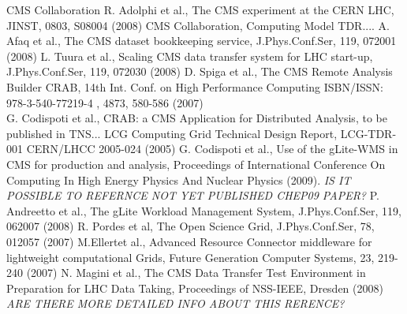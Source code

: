 \begin{thebibliography}{}
%
%
CMS Collaboration R. Adolphi et al., The CMS experiment at the CERN LHC, JINST, 0803, S08004 (2008)
%
CMS Collaboration, Computing Model TDR....
%
A. Afaq et al., The CMS dataset bookkeeping service, J.Phys.Conf.Ser, 119, 072001 (2008)
%
L. Tuura et al., Scaling CMS data transfer system for LHC start-up, J.Phys.Conf.Ser, 119, 072030 (2008)
%
D. Spiga et al., The CMS Remote Analysis Builder CRAB, 14th Int. Conf. on High Performance Computing ISBN/ISSN: 978-3-540-77219-4 , 4873, 580-586 (2007)\\
G. Codispoti et al., CRAB: a CMS Application for Distributed Analysis, to be published in TNS...
%
LCG Computing Grid Technical Design Report, LCG-TDR-001 CERN/LHCC 2005-024 (2005)
%
G. Codispoti et al., Use of the gLite-WMS in CMS for production and analysis, Proceedings of International Conference On Computing In High Energy Physics And Nuclear Physics (2009). \emph{IS IT POSSIBLE TO REFERNCE NOT YET PUBLISHED CHEP09 PAPER?}
%
 P. Andreetto et al., The gLite Workload Management System, J.Phys.Conf.Ser, 119, 062007 (2008)
%
 R. Pordes et al, The Open Science Grid, J.Phys.Conf.Ser, 78, 012057 (2007)
%
 M.Ellertet al., Advanced Resource Connector middleware
  for lightweight computational Grids, Future Generation Computer Systems, 23, 219-240 (2007)
%
 N. Magini et al., The CMS Data Transfer Test Environment in Preparation for LHC Data Taking, Proceedings of NSS-IEEE, Dresden (2008)  \emph{ARE THERE MORE DETAILED INFO ABOUT THIS RERENCE?}
\end{thebibliography}



